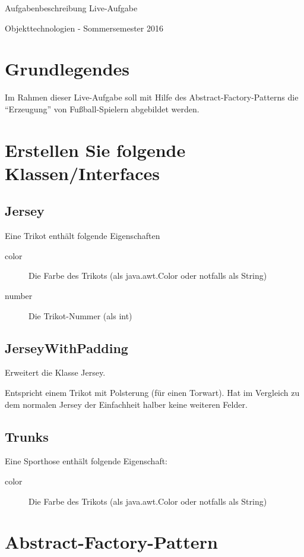 \documentclass[oneside,a4paper]{scrartcl}
\author{Johannes Schneider}
\begin{document}
\centerline{\sc \large Aufgabenbeschreibung Live-Aufgabe}
\vspace{.5pc}
\centerline{\sc Objekttechnologien - Sommersemester 2016}
\vspace{2pc}


\section{Grundlegendes}

Im Rahmen dieser Live-Aufgabe soll mit Hilfe des Abstract-Factory-Patterns 
die \enquote{Erzeugung} von Fußball-Spielern abgebildet werden.


\section{Erstellen Sie folgende Klassen/Interfaces}
\subsection{Jersey}

Eine Trikot enthält folgende Eigenschaften

\begin{description}
  \item[color] Die Farbe des Trikots (als java.awt.Color oder notfalls als String)
  \item[number] Die Trikot-Nummer (als int)
\end{description}

\subsection{JerseyWithPadding}
Erweitert die Klasse Jersey.

Entspricht einem Trikot mit Polsterung (für einen Torwart).
Hat im Vergleich zu dem normalen Jersey der Einfachheit halber keine weiteren Felder.

\subsection{Trunks}
Eine Sporthose enthält folgende Eigenschaft:

\begin{description}
  \item[color] Die Farbe des Trikots (als java.awt.Color oder notfalls als String)
\end{description}


\section{Abstract-Factory-Pattern}
\end{document}
